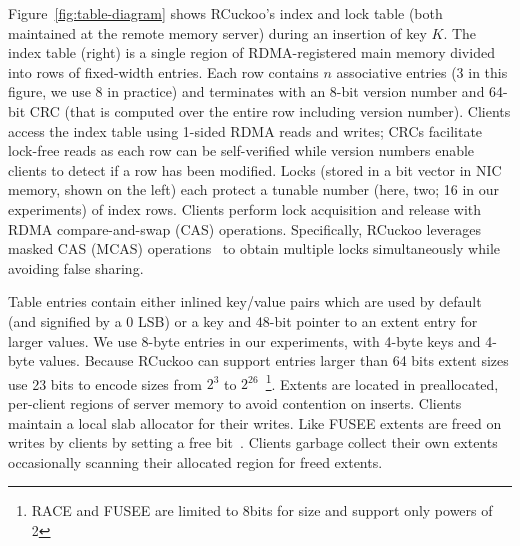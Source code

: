 Figure~\ref{fig:table-diagram} shows RCuckoo's index and lock table
(both maintained at the remote memory server) during an insertion of
key $K$.  The index table (right) is a single region of
RDMA-registered main memory divided into rows of fixed-width entries.
Each row contains $n$ associative entries (3 in this figure, we use 8
in practice) and terminates with an 8-bit version number and 64-bit
CRC (that is computed over the entire row including version number).
Clients access the index table using 1-sided RDMA reads and writes;
CRCs facilitate lock-free reads as each row can be self-verified while
version numbers enable clients to detect if a row has been modified.
Locks (stored in a bit vector in NIC memory, shown on the left) each
protect a tunable number (here, two; 16 in our experiments) of index
rows.  Clients perform lock acquisition and release with RDMA
compare-and-swap (CAS) operations.  Specifically, RCuckoo leverages
masked CAS (MCAS) operations~\cite{rdma-masked-cas,sherman} to obtain
multiple locks simultaneously while avoiding false sharing.


Table entries contain either inlined key/value pairs which are used by default (and signified by a 0
LSB) or a key and 48-bit pointer to an extent entry for larger values. We use 8-byte entries in our
experiments, with 4-byte keys and 4-byte values. Because RCuckoo can support entries larger than 64
bits extent sizes use 23 bits to encode sizes from $2^3$ to $2^{26}$~\footnote{RACE and FUSEE are
limited to 8bits for size and support only powers of 2}.
Extents are located in preallocated, per-client regions of server memory to avoid contention on
inserts. Clients maintain a local slab allocator for their writes. Like FUSEE extents are freed on
writes by clients by setting a free bit~\cite{fusee}. Clients garbage collect their own extents
occasionally scanning their allocated region for freed extents.





